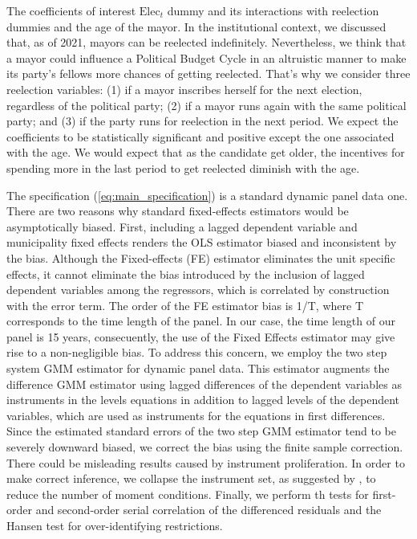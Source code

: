 The coefficients of interest $\text{Elec}_t$ dummy and its interactions with reelection dummies and the age of the mayor. In the institutional context, we discussed that, as of 2021, mayors can be reelected indefinitely. Nevertheless, we think that a mayor could influence a Political Budget Cycle in an altruistic manner to make its party's fellows more chances of getting reelected. That's why we consider three reelection variables: (1) if a mayor inscribes herself for the next election, regardless of the political party; (2) if a mayor runs again with the same political party; and (3) if the party runs for reelection in the next period. We expect the coefficients to be statistically significant and positive except the one associated with the age. We would expect that as the candidate get older, the incentives for spending more in the last period to get reelected diminish with the age. 

The specification (\ref{eq:main_specification}) is a standard dynamic panel data one. There are two reasons why standard fixed-effects estimators would be asymptotically biased. First, including a lagged dependent variable and municipality fixed effects renders the OLS estimator biased and inconsistent by the \textcite{nickell1981} bias. Although the Fixed-effects (FE) estimator eliminates the unit specific effects, it cannot eliminate the bias introduced by the inclusion of lagged dependent variables among the regressors, which is correlated by construction with the error term. The order of the FE estimator bias is 1/T, where T corresponds to the time length of the panel. In our case, the time length of our panel is 15 years, consecuently, the use of the Fixed Effects estimator may give rise to a non-negligible bias. To address this concern, we employ the \textcite{blundell1998} two step system GMM estimator for dynamic panel data. This estimator augments the \textcite{arellano1991} difference GMM estimator using lagged differences of the dependent variables as instruments in the levels equations in addition to lagged levels of the dependent variables, which are used as instruments for the equations in first differences. Since the estimated standard errors of the two step GMM estimator tend to be severely downward biased, we correct the bias using the \textcite{windmeijer2005} finite sample correction. There could be misleading results caused by instrument proliferation. In order to make correct inference, we collapse the instrument set, as suggested by \textcite{roodman2009}, to reduce the number of moment conditions. Finally, we perform th \textcite{arellano1991} tests for first-order and second-order serial correlation of the differenced residuals and the Hansen test for over-identifying restrictions. 

